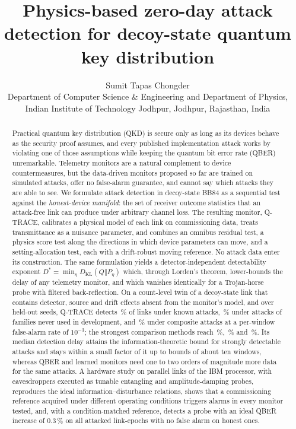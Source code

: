 \documentclass[11pt,a4paper]{article}
\title{\textbf{Physics-based zero-day attack detection for decoy-state quantum key distribution}}
\author{Sumit Tapas Chongder\\[4pt]
\small Department of Computer Science \& Engineering and Department of Physics,\\
\small Indian Institute of Technology Jodhpur, Jodhpur, Rajasthan, India}
\date{}
\theoremstyle{definition}
\theoremstyle{remark}
\newcommand{\KL}{D_{\mathrm{KL}}}
\newcommand{\Dstar}{D^{\ast}}
\newcommand{\qtrace}{Q-TRACE}
\begin{document}
\maketitle

\begin{abstract}
\noindent
Practical quantum key distribution (QKD) is secure only as long as its devices behave as the security proof assumes, and every published implementation attack works by violating one of those assumptions while keeping the quantum bit error rate (QBER) unremarkable. Telemetry monitors are a natural complement to device countermeasures, but the data-driven monitors proposed so far are trained on simulated attacks, offer no false-alarm guarantee, and cannot say which attacks they are able to see. We formulate attack detection in decoy-state BB84 as a sequential test against the \emph{honest-device manifold}: the set of receiver outcome statistics that an attack-free link can produce under arbitrary channel loss. The resulting monitor, \qtrace{}, calibrates a physical model of each link on commissioning data, treats transmittance as a nuisance parameter, and combines an omnibus residual test, a physics score test along the directions in which device parameters can move, and a setting-allocation test, each with a drift-robust moving reference. No attack data enter its construction. The same formulation yields a detector-independent detectability exponent $\Dstar=\min_\eta \KL(Q\Vert P_\eta)$ which, through Lorden's theorem, lower-bounds the delay of any telemetry monitor, and which vanishes identically for a Trojan-horse probe with filtered back-reflection. On a count-level twin of a decoy-state link that contains detector, source and drift effects absent from the monitor's model, and over \NSeeds{} held-out seeds, \qtrace{} detects \DetKnownQT\,\% of links under known attacks, \DetZeroDayQT\,\% under attacks of families never used in development, and \DetCompQT\,\% under composite attacks at a per-window false-alarm rate of $10^{-3}$; the strongest comparison methods reach \DetKnownBest\,\%, \DetZeroDayBest\,\% and \DetCompBest\,\%. Its median detection delay attains the information-theoretic bound for strongly detectable attacks and stays within a small factor of it up to bounds of about ten windows, whereas QBER and learned monitors need one to two orders of magnitude more data for the same attacks. A hardware study on \HwLinks{} parallel links of the IBM \HwBackend{} processor, with eavesdroppers executed as tunable entangling and amplitude-damping probes, reproduces the ideal information--disturbance relations, shows that a commissioning reference acquired under different operating conditions triggers alarms in every monitor tested, and, with a condition-matched reference, detects a probe with an ideal QBER increase of $0.3$\,\% on all \HwThetaAN{} attacked link-epochs with no false alarm on \HwHonestN{} honest ones.
\end{abstract}
\end{document}
